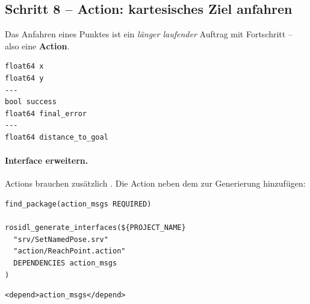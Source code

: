 \subsection{Schritt 8 -- Action: kartesisches Ziel anfahren}
Das Anfahren eines Punktes ist ein \emph{länger laufender} Auftrag mit
Fortschritt -- also eine \textbf{Action}.
\begin{lstlisting}[style=bash,caption={\code{action/ReachPoint.action}}]
float64 x
float64 y
---
bool success
float64 final_error
---
float64 distance_to_goal
\end{lstlisting}
\paragraph{Interface erweitern.} Actions brauchen zusätzlich .
Die Action neben dem  zur Generierung hinzufügen:
\begin{lstlisting}[style=bash,caption={\code{p0a\_arm\_interfaces/CMakeLists.txt} (Ergänzung)}]
find_package(action_msgs REQUIRED)

rosidl_generate_interfaces(${PROJECT_NAME}
  "srv/SetNamedPose.srv"
  "action/ReachPoint.action"
  DEPENDENCIES action_msgs
)
\end{lstlisting}
\begin{lstlisting}[style=xml,caption={\code{p0a\_arm\_interfaces/package.xml} (Ergänzung)}]
<depend>action_msgs</depend>
\end{lstlisting}

